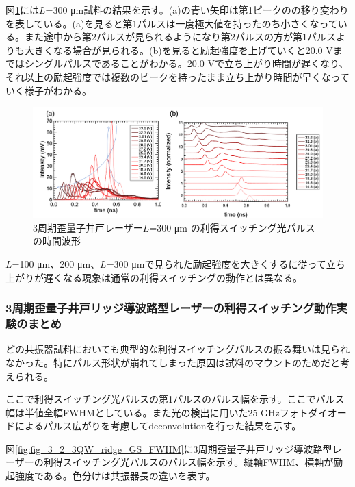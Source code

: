 {図\ref{fig:fig_3_2_3QW_ridge_L300_GS}には$L$=300 \si{\micro\metre}試料の結果を示す。(a)の青い矢印は第1ピークのの移り変わりを表している。(a)を見ると第1パルスは一度極大値を持ったのち小さくなっている。また途中から第2パルスが見られるようになり第2パルスの方が第1パルスよりも大きくなる場合が見られる。(b)を見ると励起強度を上げていくと20.0 Vまではシングルパルスであることがわかる。20.0 Vで立ち上がり時間が遅くなり、それ以上の励起強度では複数のピークを持ったまま立ち上がり時間が早くなっていく様子がわかる。
\begin{figure}[h]
	\centering
	\includegraphics[width=15cm]{figure/fig_3_2_3QW_ridge_L300_GS.png}
		\caption{3周期歪量子井戸レーザー$ L$=300 \si{\micro\metre} の利得スイッチング光パルスの時間波形}
		\label{fig:fig_3_2_3QW_ridge_L300_GS}
\end{figure}


$L$=100 \si{\micro\metre}、200 \si{\micro\metre}、$L$=300 \si{\micro\metre}で見られた励起強度を大きくするに従って立ち上がりが遅くなる現象は通常の利得スイッチングの動作とは異なる。
\subsubsection{3周期歪量子井戸リッジ導波路型レーザーの利得スイッチング動作実験のまとめ}
どの共振器試料においても典型的な利得スイッチングパルスの振る舞いは見られなかった。特にパルス形状が崩れてしまった原因は試料のマウントのためだと考えられる。


ここで利得スイッチング光パルスの第1パルスのパルス幅を示す。ここでパルス幅は半値全幅FWHMとしている。また光の検出に用いた25 GHzフォトダイオードによるパルス広がりを考慮してdeconvolutionを行った結果を示す。

図\ref{fig:fig_3_2_3QW_ridge_GS_FWHM}に3周期歪量子井戸リッジ導波路型レーザーの利得スイッチング光パルスのパルス幅を示す。縦軸FWHM、横軸が励起強度である。色分けは共振器長の違いを表す。

}
